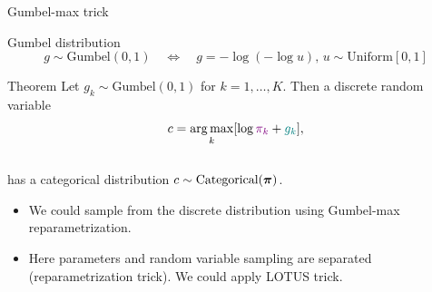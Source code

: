 \documentclass{beamer}
\begin{document}
\begin{frame}{Gumbel-max trick}
	\begin{block}{Gumbel distribution}		
		\vspace{-0.5cm}
		\[
			g \sim \text{Gumbel}(0, 1) \quad \Leftrightarrow \quad g = - \log (- \log u), \, u \sim \text{Uniform}[0, 1]
		\]
		\vspace{-0.8cm}
	\end{block}
	\begin{block}{Theorem}
		Let $g_k \sim \text{Gumbel}(0, 1)$ for $k = 1, \dots, K$. Then a discrete random variable
		\[
			c = \operatorname*{arg\,max}_k [\log {\color{violet}\pi_k} + {\color{teal}g_k}],
		\]
		\vspace{-0.4cm} \\
		has a categorical distribution $c \sim \text{Categorical}(\boldsymbol{\pi})$.
	\end{block}
	\begin{itemize}
		\item We could sample from the discrete distribution using Gumbel-max reparametrization.
		\item Here {\color{violet}parameters} and {\color{teal}random variable sampling} are separated (reparametrization trick). We could apply LOTUS trick.
	\end{itemize}

\end{frame}
\end{document}
